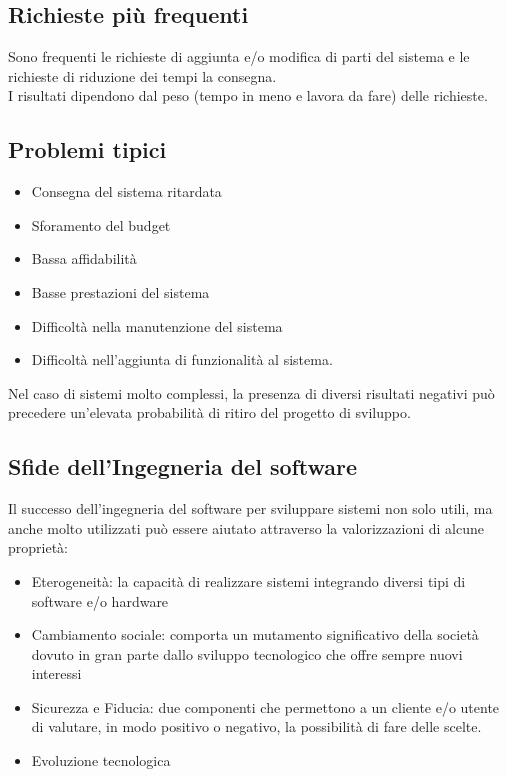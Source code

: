 \documentclass{article}
\begin{document}
	\subsection{Richieste più frequenti}
	Sono frequenti le richieste di aggiunta e/o modifica di parti del sistema e le richieste di riduzione dei tempi la consegna.\\
	I risultati dipendono dal peso (tempo in meno e lavora da fare) delle richieste.
	\subsection{Problemi tipici}
	\begin{itemize}
		\item Consegna del sistema ritardata
		\item Sforamento del budget
		\item Bassa affidabilità
		\item Basse prestazioni del sistema
		\item Difficoltà nella manutenzione del sistema
		\item Difficoltà nell’aggiunta di funzionalità al sistema.
	\end{itemize}
	Nel caso di sistemi molto complessi, la presenza di diversi risultati negativi può precedere un’elevata probabilità di ritiro del progetto di sviluppo.
	\subsection{Sfide dell’Ingegneria del software}
	Il successo dell’ingegneria del software per sviluppare sistemi non solo utili, ma anche molto utilizzati può essere aiutato attraverso la valorizzazioni di alcune proprietà:
	\begin{itemize}
		\item Eterogeneità: la capacità di realizzare sistemi integrando diversi tipi di software e/o hardware
		\item Cambiamento sociale: comporta un mutamento significativo della società dovuto in gran parte dallo sviluppo tecnologico che offre sempre nuovi interessi
		\item Sicurezza e Fiducia: due componenti che permettono a un cliente
		e/o utente di valutare, in modo positivo o negativo, la possibilità di fare
		delle scelte.
		\item Evoluzione tecnologica
	\end{itemize}
\end{document}
